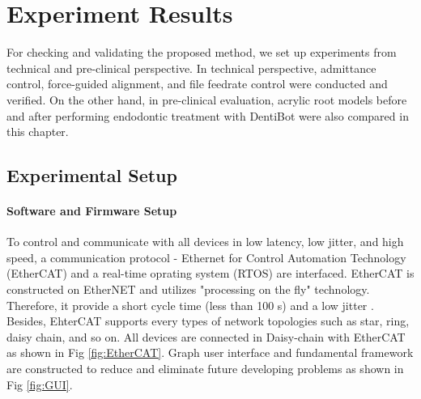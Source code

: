 \chapter{Experiment Results}
\label{chapter6}
\hspace*{6mm}For checking and validating the proposed method, we set up experiments from technical and pre-clinical perspective. In technical perspective, admittance control, force-guided alignment, and file feedrate control were conducted and verified. On the other hand, in pre-clinical evaluation, acrylic root models before and after performing endodontic treatment with DentiBot were also compared in this chapter. 
\section{Experimental Setup}
\subsubsection{Software and Firmware Setup}
\hspace*{6mm}To control and communicate with all devices in low latency, low jitter, and high speed, a communication protocol - Ethernet for Control Automation Technology (EtherCAT) and a real-time oprating system (RTOS) are interfaced. EtherCAT is constructed on EtherNET and utilizes "processing on the fly" technology. Therefore, it provide a short cycle time (less than 100 \textmu s) and a low jitter \cite{web5}. Besides, EhterCAT supports every types of network topologies such as star, ring, daisy chain, and so on.	 All devices are connected in Daisy-chain with EtherCAT as shown in Fig \ref{fig:EtherCAT}. Graph user interface and fundamental framework are constructed to reduce and eliminate future developing problems as shown in Fig \ref{fig:GUI}.

